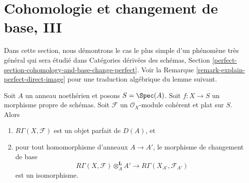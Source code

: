 \section{Cohomologie et changement de base, III}
\label{section-cohomology-and-base-change-perfect}

\noindent
Dans cette section, nous démontrons le cas le plus simple d'un phénomène très général
qui sera étudié dans
Catégories dérivées des schémas, Section
\ref{perfect-section-cohomology-and-base-change-perfect}.
Voir la Remarque \ref{remark-explain-perfect-direct-image} pour une traduction
algébrique du lemme suivant.

\begin{lemma}
\label{lemma-perfect-direct-image}
Soit $A$ un anneau noethérien et posons $S = \Spec(A)$. Soit $f : X \to S$ un
morphisme propre de schémas. Soit $\mathcal{F}$ un
$\mathcal{O}_X$-module cohérent et plat sur $S$. Alors
\begin{enumerate}
\item $R\Gamma(X, \mathcal{F})$ est un objet parfait de $D(A)$, et
\item pour tout homomorphisme d'anneaux $A \to A'$, le morphisme de changement de base
$$
R\Gamma(X, \mathcal{F}) \otimes_A^{\mathbf{L}} A'
\longrightarrow
R\Gamma(X_{A'}, \mathcal{F}_{A'})
$$
est un isomorphisme.
\end{enumerate}
\end{lemma}

